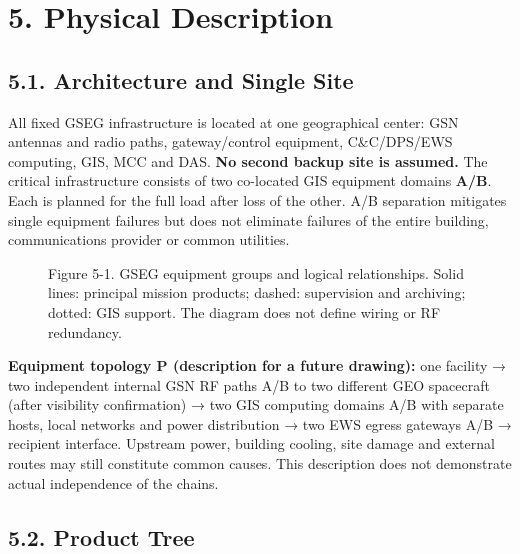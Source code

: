 \section{5. Physical Description}\label{physical-description}

\subsection{5.1. Architecture and Single Site}\label{physical-architecture}

All fixed GSEG infrastructure is located at one geographical center: GSN antennas and radio paths, gateway/\allowbreak{}control equipment, C\&C/\allowbreak{}DPS/\allowbreak{}EWS computing, GIS, MCC and DAS. \textbf{No second backup site is assumed.} The critical infrastructure consists of two co-located GIS equipment domains \textbf{A/\allowbreak{}B}. Each is planned for the full load after loss of the other. A/\allowbreak{}B separation mitigates single equipment failures but does not eliminate failures of the entire building, communications provider or common utilities.

\begin{figure}[H]
\centering

\caption{Figure 5-1. GSEG equipment groups and logical relationships.
Solid lines: principal mission products; dashed: supervision and
archiving; dotted: GIS support. The diagram does not define wiring or RF
redundancy.}
\end{figure}

\textbf{Equipment topology P (description for a future drawing):} one facility → two independent internal GSN RF paths A/\allowbreak{}B to two different GEO spacecraft (after visibility confirmation) → two GIS computing domains A/\allowbreak{}B with separate hosts, local networks and power distribution → two EWS egress gateways A/\allowbreak{}B → recipient interface. Upstream power, building cooling, site damage and external routes may still constitute common causes. This description does not demonstrate actual independence of the chains.

\subsection{5.2. Product Tree}\label{product-tree}

